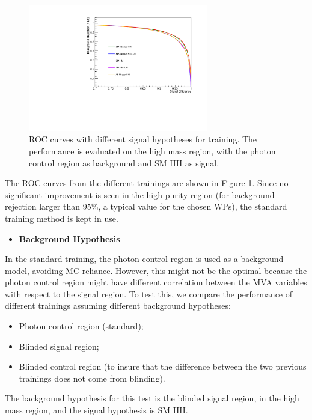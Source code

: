 \begin{figure}[h]
  \centering
  \includegraphics[width=0.7\textwidth]{figures/sec-cats/mva/ROC}\hfil
  \caption{ROC curves with different signal hypotheses for training. The performance is evaluated on the high mass region, with the photon control region as background and SM HH as signal.}
  \label{fig:mva_cc_signal}
\end{figure}


The ROC curves from the different trainings are shown in Figure \ref{fig:mva_cc_signal}. 
Since no significant improvement is seen in the high purity region (for background rejection larger than 95\%, a typical value for the chosen WPs), the standard training method is kept in use. 

\begin{itemize}
\item \textbf{Background Hypothesis}
\end{itemize}

In the standard training, the photon control region is used as a background model, avoiding MC reliance. 
However, this might not be the optimal because the photon control region might have different correlation between the MVA variables with respect to the signal region. 
To test this, we compare the performance of different trainings assuming different background hypotheses: 
\begin{itemize}
\item Photon control region (standard);
\item Blinded signal region;
\item Blinded control region (to insure that the difference between the two previous trainings does not come from blinding).
\end{itemize}
The background hypothesis for this test is the blinded signal region, in the high mass region, and the signal hypothesis is SM HH. 

